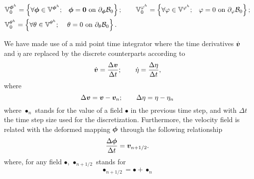 %
{\begin{equation}\label{eqn:functional spaces for discretisation virtual}
\begin{aligned}
&	\begin{aligned}
\mathbb{V}_0^{{\vect{\phi}}^h}  = \left\{\forall \vect{\phi}\in\mathbb{V}^{\vect{\phi}^h};\,\,\,\,\, \vect{\phi} = \vect{0} \,\,\text{on}\,\,\partial_{\vect{\phi}}\mathcal{B}_0\right\};\qquad
%
\mathbb{V}_0^{{{\varphi}}^h}  = \left\{\forall {\varphi}\in\mathbb{V}^{{\varphi}^h};\,\,\,\,\, {\varphi} = 0 \,\,\text{on}\,\,\partial_{{\varphi}}\mathcal{B}_0\right\};
	\end{aligned}\\
%
&\mathbb{V}_0^{{\theta}^h}  = \left\{\forall\theta\in\mathbb{V}^{\theta^h};\,\,\,\,\,\,\,{\theta} = {0} \,\,\text{on}\,\,\partial_{{\theta}}\mathcal{B}_0\right\}.
%
\end{aligned}
\end{equation}}

We have made use of a mid point time integrator where the time derivatives $\dot{\boldsymbol{v}}$ and $\dot{\eta}$ are replaced by the discrete counterparts according to
%
\begin{equation}\label{eqn:strong form first equations}
\dot{\vect{v}}=\frac{\Delta\vect{v}}{\Delta t};\qquad 
%
\dot{\eta}=\frac{\Delta \eta}{\Delta t},
%
\end{equation}
%
where 
%
\begin{equation}
	\Delta\boldsymbol{v} =  \boldsymbol{v} - \boldsymbol{v}_n;\qquad 
	\Delta\eta =  \eta - \eta_n	
\end{equation}
%
where $\bullet_n$ stands for the value of a field $\bullet$ in the previous time step, and with $\Delta t$ the time step size used for the discretization. Furthermore, the velocity field is related with the deformed mapping $\boldsymbol{\phi}$ through the following relationship
%
\begin{equation}
\frac{\Delta\boldsymbol{\phi}}{\Delta t} = \boldsymbol{v}_{n+1/2}.
\end{equation}
%
where, for any field $\bullet$,  $\bullet_{n+1/2}$ stands for 
%
\begin{equation}
	\bullet_{n+1/2}=\bullet + \bullet_n
\end{equation}

